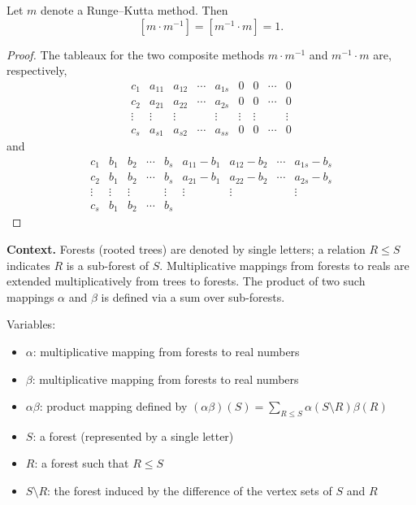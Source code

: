 \begin{theorem}

  \label{thm:382B}
Let $m$ denote a Runge--Kutta method. Then
\[
[m \cdot m^{-1}] = [m^{-1} \cdot m] = 1.
\]

\begin{proof}
The tableaux for the two composite methods $m \cdot m^{-1}$ and $m^{-1} \cdot m$
are, respectively,
\[
\begin{array}{cccccccc}
c_{1} & a_{11} & a_{12} & \cdots & a_{1s} & 0 & 0 & \cdots & 0 \\
c_{2} & a_{21} & a_{22} & \cdots & a_{2s} & 0 & 0 & \cdots & 0 \\
\vdots & \vdots & \vdots &        & \vdots & \vdots & \vdots & & \vdots \\
c_{s} & a_{s1} & a_{s2} & \cdots & a_{ss} & 0 & 0 & \cdots & 0
\end{array}
\]
and
\[
\begin{array}{cccccccc}
c_{1} & b_{1} & b_{2} & \cdots & b_{s} & a_{11}-b_{1} & a_{12}-b_{2} & \cdots & a_{1s}-b_{s} \\
c_{2} & b_{1} & b_{2} & \cdots & b_{s} & a_{21}-b_{1} & a_{22}-b_{2} & \cdots & a_{2s}-b_{s} \\
\vdots & \vdots & \vdots &        & \vdots & \vdots & \vdots & & \vdots \\
c_{s} & b_{1} & b_{2} & \cdots & b_{s} & & & & 
\end{array}
\]
\end{proof}

\noindent\textbf{Context.}
Forests (rooted trees) are denoted by single letters; a relation $R \le S$ indicates $R$ is a sub-forest of $S$. Multiplicative mappings from forests to reals are extended multiplicatively from trees to forests. The product of two such mappings $\alpha$ and $\beta$ is defined via a sum over sub-forests.

Variables:
\begin{itemize}
    \item $\alpha$: multiplicative mapping from forests to real numbers
    \item $\beta$: multiplicative mapping from forests to real numbers
    \item $\alpha\beta$: product mapping defined by $(\alpha\beta)(S) = \sum_{R \le S} \alpha(S \setminus R)\beta(R)$
    \item $S$: a forest (represented by a single letter)
    \item $R$: a forest such that $R \le S$
    \item $S \setminus R$: the forest induced by the difference of the vertex sets of $S$ and $R$
\end{itemize}


\end{theorem}
